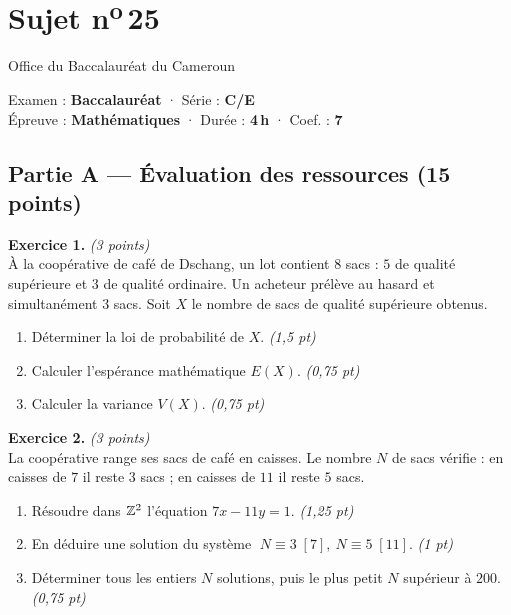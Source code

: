 \section{Sujet n\textsuperscript{o}\,25}
\noindent\begin{minipage}{0.5\linewidth}\footnotesize Office du Baccalauréat du Cameroun\end{minipage}%
\hfill\begin{minipage}{0.45\linewidth}\footnotesize\raggedleft Examen : \textbf{Baccalauréat} · Série : \textbf{C/E}\\
Épreuve : \textbf{Mathématiques} · Durée : \textbf{4\,h} · Coef. : \textbf{7}\end{minipage}
\par\smallskip{\color{onbo}\rule{\linewidth}{1pt}}

\subsection*{Partie A — Évaluation des ressources \hfill (15 points)}

\noindent\textbf{Exercice 1.} \hfill\textit{(3 points)}\\
À la coopérative de café de Dschang, un lot contient $8$ sacs : $5$ de qualité supérieure
et $3$ de qualité ordinaire. Un acheteur prélève au hasard et simultanément $3$ sacs. Soit
$X$ le nombre de sacs de qualité supérieure obtenus.
\begin{enumerate}[label=\arabic*)]
\item Déterminer la loi de probabilité de $X$. \hfill\textit{(1,5 pt)}
\item Calculer l'espérance mathématique $E(X)$. \hfill\textit{(0,75 pt)}
\item Calculer la variance $V(X)$. \hfill\textit{(0,75 pt)}
\end{enumerate}

\smallskip
\noindent\textbf{Exercice 2.} \hfill\textit{(3 points)}\\
La coopérative range ses sacs de café en caisses. Le nombre $N$ de sacs vérifie :
en caisses de $7$ il reste $3$ sacs ; en caisses de $11$ il reste $5$ sacs.
\begin{enumerate}[label=\arabic*)]
\item Résoudre dans $\mathbb{Z}^2$ l'équation $7x-11y=1$. \hfill\textit{(1,25 pt)}
\item En déduire une solution du système $\;N\equiv3\;[7],\ N\equiv5\;[11]$. \hfill\textit{(1 pt)}
\item Déterminer tous les entiers $N$ solutions, puis le plus petit $N$ supérieur à $200$. \hfill\textit{(0,75 pt)}
\end{enumerate}

